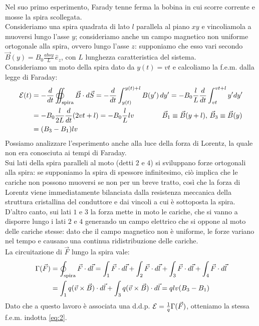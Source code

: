 Nel suo primo esperimento, Farady tenne ferma la bobina in cui scorre corrente e mosse la spira scollegata. \\ 
%
Consideriamo una spira quadrata di lato $ l $ parallela al piano $ xy $ e vincoliamola a muoversi lungo l'asse $ y $; consideriamo anche un campo magnetico non uniforme ortogonale alla spira, ovvero lungo l'asse $ z $: supponiamo che esso vari secondo $ \vec{B}(y) = B_0 \frac{abs{y}}{L} \,\hat{e}_z $, con $ L $ lunghezza caratteristica del sistema. \\ 
%
Consideriamo un moto della spira dato da $ y(t) = vt $ e calcoliamo la f.e.m. dalla legge di Faraday:
\begin{equation}
	\begin{split}
		\mathcal{E}(t) &= -\frac{d}{dt} \oiint_{\text{spira}} \vec{B}\cdot d\vec{S} = -\frac{d}{dt} \int_{y(t)}^{y(t)+l} B(y')\,dy' = -B_0 \frac{l}{L} \frac{d}{dt} \int_{vt}^{vt+l} y'dy' \\ 
		      &= -B_0 \frac{l}{2L} \frac{d}{dt} (2vt + l) = - B_0 \frac{l}{L} lv \qquad\qquad \vec{B}_1 \equiv \vec{B}(y + l), \, \vec{B}_3 \equiv \vec{B}(y) \\ 
		      &= (B_3 - B_1) lv
	\end{split}
	\label{eq:2}
\end{equation}
Possiamo analizzare l'esperimento anche alla luce della forza di Lorentz, la quale non era conosciuta ai tempi di Faraday. \\ 
%
Sui lati della spira paralleli al moto (detti $ 2 $ e $ 4 $) si sviluppano forze ortogonali alla spira: se supponiamo la spira di spessore infinitesimo, ciò implica che le cariche non possono muoversi se non per un breve tratto, così che la forza di Lorentz viene immediatamente bilanciata dalla resistenza meccanica della struttura cristallina del conduttore e dai vincoli a cui è sottoposta la spira. D'altro canto, sui lati $ 1 $ e $ 3 $ la forza mette in moto le cariche, che si vanno a disporre lungo i lati $ 2 $ e $ 4 $ generando un campo elettrico che si oppone al moto delle cariche stesse: dato che il campo magnetico non è uniforme, le forze variano nel tempo e causano una continua ridistribuzione delle cariche. \\ 
%
La circuitazione di $ \vec{F} $ lungo la spira vale:
\begin{equation}
	\begin{split}
		\Gamma(\vec{F}) &= \oint_{\text{spira}} \vec{F}\cdot d\vec{l} = \int_1 \vec{F}\cdot d\vec{l} + \int_2 \vec{F}\cdot d\vec{l} + \int_3 \vec{F}\cdot d\vec{l} + \int_4 \vec{F}\cdot d\vec{l} \\ 
				&= \int_1 q (\vec{v}\times\vec{B})\cdot d\vec{l} + \int_3 q (\vec{v}\times\vec{B})\cdot d\vec{l} = qlv(B_3 - B_1)
	\end{split}
	\label{eq:3}
\end{equation}
Dato che a questo lavoro è associata una d.d.p. $ \mathcal{E} = \frac{1}{q} \Gamma(\vec{F}) $, otteniamo la stessa f.e.m. indotta \ref{eq:2}.

